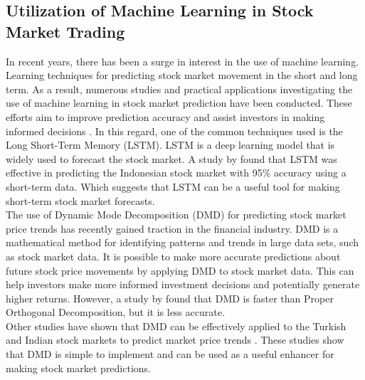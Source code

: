 \subsection{Utilization of Machine Learning in Stock Market Trading}
In recent years, there has been a surge in interest in the use of machine learning.
Learning techniques for predicting stock market movement in the short and long term. 
As a result, numerous studies and practical applications investigating the use of 
machine learning in stock market prediction have been conducted. These efforts aim 
to improve prediction accuracy and assist investors in making informed decisions
\cite{Kumbure2022, Strader2020, Soni2022, Rea2020, Guo2022}.
In this regard, one of the common techniques used is the Long Short-Term Memory (LSTM).
LSTM is a deep learning model that is widely used to forecast the stock market. 
A study by  found that LSTM was effective in predicting the 
Indonesian stock market with 95\% accuracy using a short-term data. 
Which suggests that LSTM can be a useful tool for making short-term 
stock market forecasts.
\hfill \\

The use of Dynamic Mode Decomposition (DMD) for predicting stock market price 
trends has recently gained traction in the financial industry. DMD is a mathematical 
method for identifying patterns and trends in large data sets, such as stock market 
data. It is possible to make more accurate predictions about future stock price 
movements by applying DMD to stock market data. This can help investors make more 
informed investment decisions and potentially generate higher returns.
However, a study by  found that DMD is faster than 
Proper Orthogonal Decomposition, but it is less accurate.
\hfill \\

Other studies have shown that DMD can be effectively applied to the Turkish and 
Indian stock markets to predict market price trends
\cite{Savas2017, Kuttichira2017}.
These studies show that DMD is simple to implement and can be used 
as a useful enhancer for making stock market predictions.
\hfill \\